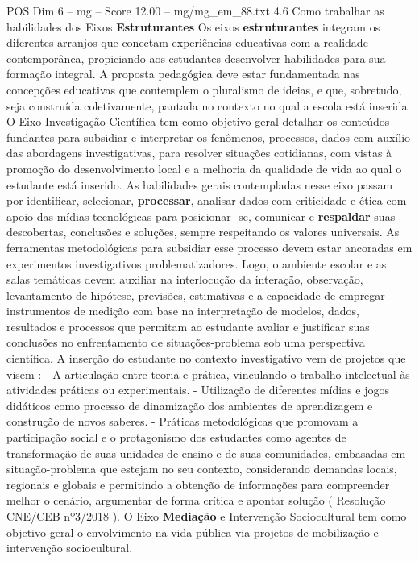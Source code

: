 \begin{textsample}{POS Dim 6 – mg – Score 12.00 – mg/mg\_em\_88.txt}  \label{ex:f6_pos_242}
4.6 Como trabalhar as habilidades dos Eixos \textbf{Estruturantes} Os eixos \textbf{estruturantes} integram os diferentes arranjos que conectam experiências educativas com a realidade contemporânea, propiciando aos estudantes desenvolver habilidades para sua formação integral.
A proposta pedagógica deve estar fundamentada nas concepções educativas que contemplem o pluralismo de ideias, e que, sobretudo, seja construída coletivamente, pautada no contexto no qual a escola está inserida.
O Eixo Investigação Científica tem como objetivo geral detalhar os conteúdos fundantes para subsidiar e interpretar os fenômenos, processos, dados com auxílio das abordagens investigativas, para resolver situações cotidianas, com vistas à promoção do desenvolvimento local e a melhoria da qualidade de vida ao qual o estudante está inserido.
As habilidades gerais contempladas nesse eixo passam por identificar, selecionar, \textbf{processar}, analisar dados com criticidade e ética com apoio das mídias tecnológicas para posicionar -se, comunicar e \textbf{respaldar} suas descobertas, conclusões e soluções, sempre respeitando os valores universais.
As ferramentas metodológicas para subsidiar esse processo devem estar ancoradas em experimentos investigativos problematizadores.
Logo, o ambiente escolar e as salas temáticas devem auxiliar na interlocução da interação, observação, levantamento de hipótese, previsões, estimativas e a capacidade de empregar instrumentos de medição com base na interpretação de modelos, dados, resultados e processos que permitam ao estudante avaliar e justificar suas conclusões no enfrentamento de situações-problema sob uma perspectiva científica.
A inserção do estudante no contexto investigativo vem de projetos que visem : - A articulação entre teoria e prática, vinculando o trabalho intelectual às atividades práticas ou experimentais. - Utilização de diferentes mídias e jogos didáticos como processo de dinamização dos ambientes de aprendizagem e construção de novos saberes. - Práticas metodológicas que promovam a participação social e o protagonismo dos estudantes como agentes de transformação de suas unidades de ensino e de suas comunidades, embasadas em situação-problema que estejam no seu contexto, considerando demandas locais, regionais e globais e permitindo a obtenção de informações para compreender melhor o cenário, argumentar de forma crítica e apontar solução ( Resolução CNE/CEB nº3/2018 ).
O Eixo \textbf{Mediação} e Intervenção Sociocultural tem como objetivo geral o envolvimento na vida pública via projetos de mobilização e intervenção sociocultural.

\end{textsample}

